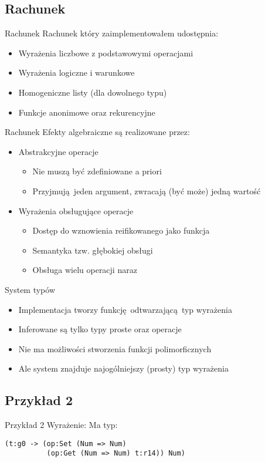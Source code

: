 \documentclass{beamer}
\begin{document}
\subsection{Rachunek}
\begin{frame}{Rachunek}
	\pause
	Rachunek który zaimplementowałem udostępnia:
	\begin{itemize}
		\pause
		\item Wyrażenia liczbowe z podstawowymi operacjami
		\pause
		\item Wyrażenia logiczne i warunkowe
		\pause
		\item Homogeniczne listy (dla dowolnego typu)
		\pause
		\item Funkcje anonimowe oraz rekurencyjne
	\end{itemize}
\end{frame}

\begin{frame}{Rachunek}
	Efekty algebraiczne są realizowane przez:	
	\begin{itemize}
		\pause
		\item Abstrakcyjne operacje
		\begin{itemize}
			\pause
			\item Nie muszą być zdefiniowane a priori
			\pause
			\item Przyjmują jeden argument, zwracają (być może) jedną wartość
		\end{itemize}
		\pause
		\item Wyrażenia obsługujące operacje
		\begin{itemize}
			\pause
			\item Dostęp do wznowienia reifikowanego jako funkcja
			\pause
			\item Semantyka tzw. głębokiej obsługi
			\pause
			\item Obsługa wielu operacji naraz
		\end{itemize}
	\end{itemize}
\end{frame}

\begin{frame}{System typów}
	\begin{itemize}
		\pause
		\item Implementacja tworzy funkcję odtwarzającą typ wyrażenia
		\pause
		\item Inferowane są tylko typy proste oraz operacje
		\pause
		\item Nie ma możliwości stworzenia funkcji polimorficznych
		\pause
		\item Ale system znajduje najogólniejszy (prosty) typ wyrażenia
	\end{itemize}
\end{frame}

\subsection{Przykład 2}
\begin{frame}[fragile]{Przykład 2}
	\pause
	Wyrażenie:
	\pause
	\pause
	Ma typ:
	\pause
\begin{verbatim}
(t:g0 -> (op:Set (Num => Num)
          (op:Get (Num => Num) t:r14)) Num)
\end{verbatim}
\end{frame}
\end{document}

